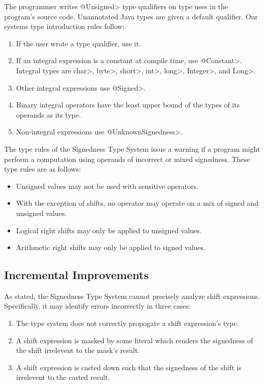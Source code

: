 The programmer writes \<@Unsigned> type qualifiers on type uses
in the program's source code.  Unannotated Java types
are given a default qualifier. Our systems type introduction rules follow:

\begin{enumerate}\itemsep 0pt \parskip 0pt
  \item If the user wrote a type qualifier, use it.
  \item If an integral expression is a constant at compile time, use
    \<@Constant>.
    Integral types are \<char>, \<byte>, \<short>, \<int>, \<long>, \<Integer>, and \<Long>.
  \item Other integral expressions use \<@Signed>.
  \item Binary integral operators have the least upper bound of the types of
  its operands as its type.
  \item Non-integral expressions use \<@UnknownSignedness>.
\end{enumerate}

The type rules of the Signedness Type System issue a warning if a program
might perform a computation using operands of incorrect or mixed signedness.
These type rules are as follows:

\begin{itemize}\itemsep 0pt \parskip 0pt
  \item Unsigned values may not be used with sensitive
    operators.
  \item With the exception of shifts, no operator may operate on a mix of
    signed and unsigned values.
  \item Logical right shifts may only be applied to unsigned values.
  \item Arithmetic right shifts may only be applied to signed values.
\end{itemize}

\subsection{Incremental Improvements}

As stated, the Signedness Type System cannot precisely analyze shift
expressions. Specifically, it may identify errors incorrectly in three cases:

\begin{enumerate}
  \item The type system does not correctly propogate a shift expression's type.
  \item A shift expression is masked by some literal which renders the
  signedness of the shift irrelevent to the mask's result.
  \item A shift expression is casted down such that the signedness of the
  shift is irrelevent to the casted result.
\end{enumerate}


